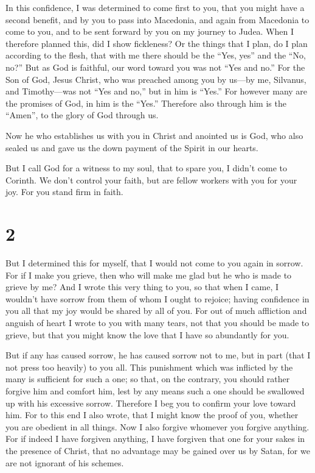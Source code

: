  In this confidence, I was determined to come first to
you, that you might have a second benefit,  and by you to
pass into Macedonia, and again from Macedonia to come to you, and to be
sent forward by you on my journey to Judea.  When I
therefore planned this, did I show fickleness? Or the things that I
plan, do I plan according to the flesh, that with me there should be the
``Yes, yes'' and the ``No, no?''  But as God is faithful,
our word toward you was not ``Yes and no.''  For the Son
of God, Jesus Christ, who was preached among you by us---by me,
Silvanus, and Timothy---was not ``Yes and no,'' but in him is ``Yes.''
 For however many are the promises of God, in him is the
``Yes.'' Therefore also through him is the ``Amen'', to the glory of God
through us.

 Now he who establishes us with you in Christ and
anointed us is God,  who also sealed us and gave us the
down payment of the Spirit in our hearts.

 But I call God for a witness to my soul, that to spare
you, I didn't come to Corinth.  We don't control your
faith, but are fellow workers with you for your joy. For you stand firm
in faith.

\hypertarget{section-1}{%
\section{2}\label{section-1}}

 But I determined this for myself, that I would not come
to you again in sorrow.  For if I make you grieve, then
who will make me glad but he who is made to grieve by me? 
And I wrote this very thing to you, so that when I came, I wouldn't have
sorrow from them of whom I ought to rejoice; having confidence in you
all that my joy would be shared by all of you.  For out of
much affliction and anguish of heart I wrote to you with many tears, not
that you should be made to grieve, but that you might know the love that
I have so abundantly for you.

 But if any has caused sorrow, he has caused sorrow not to
me, but in part (that I not press too heavily) to you all.
 This punishment which was inflicted by the many is
sufficient for such a one;  so that, on the contrary, you
should rather forgive him and comfort him, lest by any means such a one
should be swallowed up with his excessive sorrow. 
Therefore I beg you to confirm your love toward him.  For
to this end I also wrote, that I might know the proof of you, whether
you are obedient in all things.  Now I also forgive
whomever you forgive anything. For if indeed I have forgiven anything, I
have forgiven that one for your sakes in the presence of Christ,
 that no advantage may be gained over us by Satan, for we
are not ignorant of his schemes.

